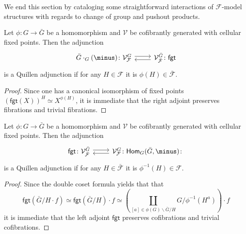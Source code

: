 \documentclass[a4paper,10pt]{article}%
\begin{document}
We end this section by cataloging some straightforward interactions of $\mathcal{F}$-model structures
with regards to change of group and pushout products.


\begin{proposition}\label{FGTRIGHT PROP}
  Let $\phi \colon G \to \bar{G}$ be a homomorphism and $\mathcal{V}$ be cofibrantly generated with cellular fixed points.	
  Then the adjunction
  \begin{equation}
    \begin{tikzcd}
      \bar{G}\cdot_G(\minus)
      \colon
      \mathcal{V}^{G}_{\mathcal{F}} \ar[shift left=1]{r}
      &
      \mathcal{V}^{\bar{G}}_{\bar{\mathcal{F}}}
      \colon \ar[shift left=1]{l}
      \mathsf{fgt}
    \end{tikzcd}
  \end{equation}
  is a Quillen adjunction if for any 
  $H \in \mathcal{F}$ it is $\phi(H) \in \bar{\mathcal{F}}$.
\end{proposition}

\begin{proof}
  Since one has a canonical isomorphism of fixed points
  $\left(\mathsf{fgt}(X)\right)^H \simeq X^{\phi(H)}$,
  it is immediate that the right adjoint preserves fibrations and trivial fibrations.
\end{proof}


\begin{proposition}\label{FGTLEFT PROP}
  Let $\phi \colon G \to \bar{G}$ be a homomorphism and $\mathcal{V}$ be cofibrantly generated with cellular fixed points.		
  Then the adjunction
  \begin{equation}
    \begin{tikzcd}
      \mathsf{fgt}
      \colon
      \mathcal{V}^{\bar{G}}_{\mathcal{\bar{F}}} \ar[shift left=1]{r}
      &
      \mathcal{V}^{G}_{\mathcal{F}}
      \colon
      \mathsf{Hom}_G(\bar{G},\minus)
      \colon \ar[shift left=1]{l}
    \end{tikzcd}
  \end{equation}
  is a Quillen adjunction if for any 
  $H \in \bar{\mathcal{F}}$ it is 
  $\phi^{-1}(H) \in \mathcal{F}$.
\end{proposition}


\begin{proof}
  Since the double coset formula yields that that
  \[
  \mathsf{fgt}\left(\bar{G}/H \cdot f\right)
  \simeq 
  \mathsf{fgt}\left(\bar{G}/H\right) \cdot f
  \simeq
  \left(
    \coprod_{[a] \in \phi(G)\backslash \bar{G} /H}
    {G/\phi^{-1}(H^{a})}
  \right)	\cdot f
  \]
  it is immediate that the left adjoint $\mathsf{fgt}$ preserves cofibrations and trivial cofibrations.
\end{proof}
\end{document}
